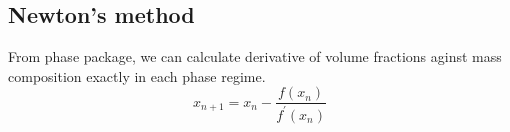\subsection{Newton's method}
From phase package, we can calculate derivative of volume fractions aginst mass composition exactly in each phase regime.
$$
x_{n+1} = x_{n} - \frac{f(x_{n})}{f^{'}(x_{n})}
$$

